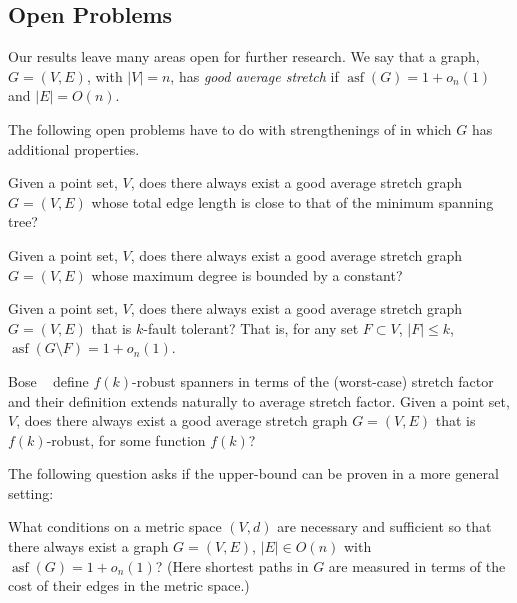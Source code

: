 \documentclass{patmorin}
\DeclareMathOperator{\asf}{asf}
\begin{document}
\noindent

\subsection{Open Problems}

Our results leave many areas open for further research.  We say that
a graph, $G=(V,E)$, with $|V|=n$, has \emph{good average stretch} if
$\asf(G)=1+o_n(1)$ and $|E|=O(n)$.

The following open problems have to do with strengthenings of
 in which $G$ has additional properties.

\begin{op}
  Given a point set, $V$, does there always exist a good average stretch
  graph $G=(V,E)$ whose total edge length is close to that of the minimum
  spanning tree?
\end{op}

\begin{op}
  Given a point set, $V$, does there always exist a good average stretch
  graph $G=(V,E)$ whose maximum degree is bounded by a constant?
\end{op}

\begin{op}
  Given a point set, $V$, does there always exist a good average stretch
  graph $G=(V,E)$ that is $k$-fault tolerant? That is, for any set
  $F\subset V$, $|F|\le k$, $\asf(G\setminus F)=1+o_n(1)$.
\end{op}

\begin{op}
  Bose \etal\ \cite{bose.dujmovic.ea:robust} define $f(k)$-robust spanners
  in terms of the (worst-case) stretch factor and their definition
  extends naturally to average stretch factor.  Given a point set, $V$,
  does there always exist a good average stretch graph $G=(V,E)$ that
  is $f(k)$-robust, for some function $f(k)$?
\end{op}


The following question asks if the upper-bound can be proven in a more
general setting:

\begin{op}
  What conditions on a metric space $(V,d)$ are necessary and sufficient
  so that there always exist a graph $G=(V,E)$, $|E|\in O(n)$ with
  $\asf(G)=1+o_n(1)$?  (Here shortest paths in $G$ are measured in terms
  of the cost of their edges in the metric space.)
\end{op}
\end{document}
